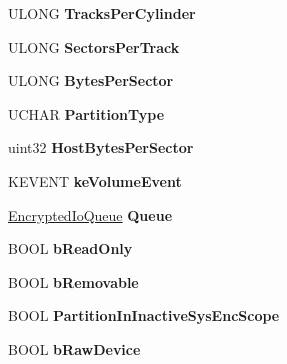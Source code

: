 \begin{DoxyCompactItemize}
U\+L\+O\+NG {\bfseries Tracks\+Per\+Cylinder}
\item 
\mbox{\label{struct_e_x_t_e_n_s_i_o_n_ae12f9e8bac96acde0e8b4492719721d7}} 
U\+L\+O\+NG {\bfseries Sectors\+Per\+Track}
\item 
\mbox{\label{struct_e_x_t_e_n_s_i_o_n_aabdff654fd9b0e941bfed7845c23b84e}} 
U\+L\+O\+NG {\bfseries Bytes\+Per\+Sector}
\item 
\mbox{\label{struct_e_x_t_e_n_s_i_o_n_a63a3a38c5f0348a04bd140b7189f57ca}} 
U\+C\+H\+AR {\bfseries Partition\+Type}
\item 
\mbox{\label{struct_e_x_t_e_n_s_i_o_n_a6fbcd2de7216d26e1914dfac89db2846}} 
uint32 {\bfseries Host\+Bytes\+Per\+Sector}
\item 
\mbox{\label{struct_e_x_t_e_n_s_i_o_n_ad6ddd2243fc2ea6e241be071e4c98144}} 
K\+E\+V\+E\+NT {\bfseries ke\+Volume\+Event}
\item 
\mbox{\label{struct_e_x_t_e_n_s_i_o_n_a62e2e59149e28cbf006f8eb3e360193f}} 
\hyperlink{struct_encrypted_io_queue}{Encrypted\+Io\+Queue} {\bfseries Queue}
\item 
\mbox{\label{struct_e_x_t_e_n_s_i_o_n_a43a2988319541e72e40e300f25af79e9}} 
B\+O\+OL {\bfseries b\+Read\+Only}
\item 
\mbox{\label{struct_e_x_t_e_n_s_i_o_n_a7d0528776a6dc15909730100cc2cf11c}} 
B\+O\+OL {\bfseries b\+Removable}
\item 
\mbox{\label{struct_e_x_t_e_n_s_i_o_n_a763f648eb727aaca1d8cfce2af8c0801}} 
B\+O\+OL {\bfseries Partition\+In\+Inactive\+Sys\+Enc\+Scope}
\item 
\mbox{\label{struct_e_x_t_e_n_s_i_o_n_a1f0d3794f091e6885a8e8bccabb23238}} 
B\+O\+OL {\bfseries b\+Raw\+Device}
\item 
\mbox{\label{struct_e_x_t_e_n_s_i_o_n_aeeb1abbcb202239e3808164d14acdfb2}} 

\end{DoxyCompactItemize}
